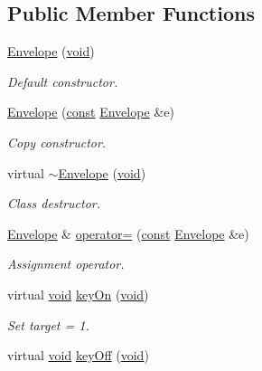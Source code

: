 \subsection*{Public Member Functions}
\begin{DoxyCompactItemize}
\item 
\hyperlink{class_nyq_1_1_envelope_a62e2edc0407cd99c0aa3a1fe7ff8207f}{Envelope} (\hyperlink{sound_8c_ae35f5844602719cf66324f4de2a658b3}{void})
\begin{DoxyCompactList}\small\item\em Default constructor. \end{DoxyCompactList}\item 
\hyperlink{class_nyq_1_1_envelope_abb5526be40dcb91e45c1e3d217ca9038}{Envelope} (\hyperlink{getopt1_8c_a2c212835823e3c54a8ab6d95c652660e}{const} \hyperlink{class_nyq_1_1_envelope}{Envelope} \&e)
\begin{DoxyCompactList}\small\item\em Copy constructor. \end{DoxyCompactList}\item 
virtual \hyperlink{class_nyq_1_1_envelope_a02d508102f6dc477eeb98b19402dab93}{$\sim$\+Envelope} (\hyperlink{sound_8c_ae35f5844602719cf66324f4de2a658b3}{void})
\begin{DoxyCompactList}\small\item\em Class destructor. \end{DoxyCompactList}\item 
\hyperlink{class_nyq_1_1_envelope}{Envelope} \& \hyperlink{class_nyq_1_1_envelope_a7f4e3f20ac93897ecfadf043028e0b2c}{operator=} (\hyperlink{getopt1_8c_a2c212835823e3c54a8ab6d95c652660e}{const} \hyperlink{class_nyq_1_1_envelope}{Envelope} \&e)
\begin{DoxyCompactList}\small\item\em Assignment operator. \end{DoxyCompactList}\item 
virtual \hyperlink{sound_8c_ae35f5844602719cf66324f4de2a658b3}{void} \hyperlink{class_nyq_1_1_envelope_aff5b44f31863b244361b42658bbcc3c1}{key\+On} (\hyperlink{sound_8c_ae35f5844602719cf66324f4de2a658b3}{void})
\begin{DoxyCompactList}\small\item\em Set target = 1. \end{DoxyCompactList}\item 
virtual \hyperlink{sound_8c_ae35f5844602719cf66324f4de2a658b3}{void} \hyperlink{class_nyq_1_1_envelope_a74fbc2c92c6d089eb22f2ae270816eb0}{key\+Off} (\hyperlink{sound_8c_ae35f5844602719cf66324f4de2a658b3}{void})

\end{DoxyCompactItemize}
